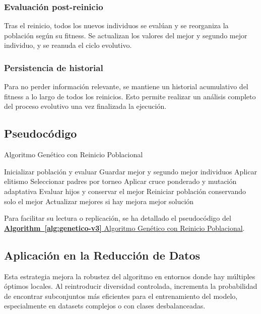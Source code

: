 \subsubsection{Evaluación post-reinicio}
Tras el reinicio, todos los nuevos individuos se evalúan y se reorganiza la población según su fitness.
Se actualizan los valores del mejor y segundo mejor individuo, y se reanuda el ciclo evolutivo.

\subsubsection{Persistencia de historial}
Para no perder información relevante, se mantiene un historial acumulativo del fitness a lo largo de todos los reinicios.
Esto permite realizar un análisis completo del proceso evolutivo una vez finalizada la ejecución.



\subsection{Pseudocódigo}\label{subsec:Pseudocodigo-genetico-v3}
\begin{algorithm}[htp]
      \caption{Algoritmo Genético con Reinicio Poblacional}
      \label{alg:genetico-v3}
      \begin{algorithmic}[1]
            \State Inicializar población y evaluar
            \State Guardar mejor y segundo mejor individuos
            \State Aplicar elitismo
            \State Seleccionar padres por torneo
            \State Aplicar cruce ponderado y mutación adaptativa
            \State Evaluar hijos y conservar el mejor
            \EndWhile
            \State Reiniciar población conservando solo el mejor
            \EndIf
            \State Actualizar mejores si hay mejora
            \EndWhile
            \State \Return mejor solución
      \end{algorithmic}
\end{algorithm}

Para facilitar su lectura o replicación, se ha detallado el pseudocódigo del \hyperref[alg:genetico-v3]{\textbf{Algorithm~\ref*{alg:genetico-v3}} Algoritmo Genético con Reinicio Poblacional}.

\subsection{Aplicación en la Reducción de Datos}\label{subsec:aplicacion-en-la-reduccion-de-datos-genetico-v3}
Esta estrategia mejora la robustez del algoritmo en entornos donde hay múltiples óptimos locales.
Al reintroducir diversidad controlada, incrementa la probabilidad de encontrar subconjuntos más eficientes para el entrenamiento del modelo,
especialmente en datasets complejos o con clases desbalanceadas.


